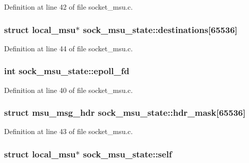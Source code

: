 Definition at line 42 of file socket\-\_\-msu.\-c.

\hypertarget{structsock__msu__state_a316dd9a4f75911daa33496088766b3da}{
\subsubsection[{destinations}]{\setlength{\rightskip}{0pt plus 5cm}struct {\bf local\-\_\-msu}$\ast$ sock\-\_\-msu\-\_\-state\-::destinations\mbox{[}65536\mbox{]}}}\label{structsock__msu__state_a316dd9a4f75911daa33496088766b3da}


Definition at line 44 of file socket\-\_\-msu.\-c.

\hypertarget{structsock__msu__state_ad759ccb29fb3de7b6dda139dbde0e825}{
\subsubsection[{epoll\-\_\-fd}]{\setlength{\rightskip}{0pt plus 5cm}int sock\-\_\-msu\-\_\-state\-::epoll\-\_\-fd}}\label{structsock__msu__state_ad759ccb29fb3de7b6dda139dbde0e825}


Definition at line 40 of file socket\-\_\-msu.\-c.

\hypertarget{structsock__msu__state_ab195dc5130a98fdf868543dc6e153fcb}{
\subsubsection[{hdr\-\_\-mask}]{\setlength{\rightskip}{0pt plus 5cm}struct {\bf msu\-\_\-msg\-\_\-hdr} sock\-\_\-msu\-\_\-state\-::hdr\-\_\-mask\mbox{[}65536\mbox{]}}}\label{structsock__msu__state_ab195dc5130a98fdf868543dc6e153fcb}


Definition at line 43 of file socket\-\_\-msu.\-c.

\hypertarget{structsock__msu__state_a041ff140d8b0451b98418ea68dc4f62c}{
\subsubsection[{self}]{\setlength{\rightskip}{0pt plus 5cm}struct {\bf local\-\_\-msu}$\ast$ sock\-\_\-msu\-\_\-state\-::self}}\label{structsock__msu__state_a041ff140d8b0451b98418ea68dc4f62c}


